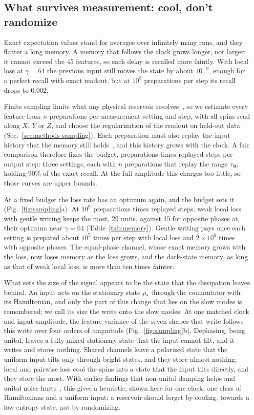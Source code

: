 \subsection{What survives measurement: cool, don't randomize}
\label{sec:price}
Exact expectation values stand for averages over infinitely many runs, and they flatter a long memory. A memory that
follows the clock grows longer, not larger: it cannot exceed the 45 features, so each delay is recalled more faintly.
With local loss at $\gamma=64$ the previous input still moves the state by about $10^{-9}$, enough for a perfect
recall with exact readout, but at $10^8$ preparations per step its recall drops to 0.002.

Finite sampling limits what any physical reservoir resolves~\cite{Hu2023}, so we estimate every feature from $n$
preparations per measurement setting and step, with all spins read along $X$, $Y$ or $Z$, and choose the
regularization of the readout on held-out data (Sec.~\ref{sec:methods-sampling}). Each preparation must also replay
the input history that the memory still holds~\cite{Cindrak2024}, and this history grows with the clock. A fair
comparison therefore fixes the budget, preparations times replayed steps per output step: three settings, each with
$n$ preparations that replay the range $\tau_{90}$ holding 90\% of the exact recall. At the full amplitude this charges
too little, so those curves are upper bounds.

At a fixed budget the loss rate has an optimum again, and the budget sets it (Fig.~\ref{fig:sampling}a). At $10^9$
preparations times replayed steps, weak local loss with gentle writing keeps the most, 29 units, against 15 for
opposite phases at their optimum near $\gamma=64$ (Table~\ref{tab:memory}). Gentle writing pays once each setting is
prepared about $10^5$ times per step with local loss and $2\times10^6$ times with opposite phases. The equal-phase
channel, whose exact memory grows with the loss, now loses memory as the loss grows, and the dark-state memory, as
long as that of weak local loss, is more than ten times fainter.

What sets the size of the signal appears to be the state that the dissipation leaves behind. An input acts on the
stationary state $\rho_*$ through the commutator with its Hamiltonian, and only the part of this change that lies on
the slow modes is remembered; we call its size the write onto the slow modes. At one matched clock and input
amplitude, the feature variance of the seven shapes that write follows this write over four orders of magnitude
(Fig.~\ref{fig:sampling}b). Dephasing, being unital, leaves a fully mixed stationary state that the input cannot tilt,
and it writes and stores nothing. Shared channels leave a polarized state that the uniform input tilts only through
bright states, and they store almost nothing; local and pairwise loss cool the spins into a state that the input
tilts directly, and they store the most. With earlier findings that non-unital damping helps and unital noise
hurts~\cite{Ricci2026,Domingo2023}, this gives a heuristic, shown here for one clock, one class of Hamiltonians and a
uniform input: a reservoir should forget by cooling, towards a low-entropy state, not by randomizing.

